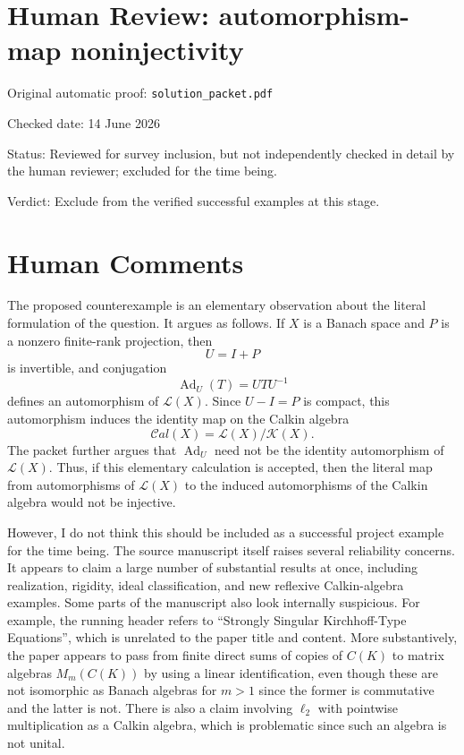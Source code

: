 \documentclass[11pt]{article}
\newcommand{\Lop}{\mathcal L}
\newcommand{\K}{\mathcal K}
\newcommand{\Cal}{\mathcal C\!al}
\newcommand{\Ad}{\operatorname{Ad}}
\begin{document}
\section*{Human Review: automorphism-map noninjectivity}

\noindent Original automatic proof: \texttt{solution\_packet.pdf}

\noindent Checked date: 14 June 2026

\noindent Status: Reviewed for survey inclusion, but not independently checked
in detail by the human reviewer; excluded for the time being.

\noindent Verdict: Exclude from the verified successful examples at this stage.

\section*{Human Comments}

The proposed counterexample is an elementary observation about the literal
formulation of the question.  It argues as follows.  If \(X\) is a Banach
space and \(P\) is a nonzero finite-rank projection, then
\[
  U=I+P
\]
is invertible, and conjugation
\[
  \Ad_U(T)=UTU^{-1}
\]
defines an automorphism of \(\Lop(X)\).  Since \(U-I=P\) is compact, this
automorphism induces the identity map on the Calkin algebra
\[
  \Cal(X)=\Lop(X)/\K(X).
\]
The packet further argues that \(\Ad_U\) need not be the identity
automorphism of \(\Lop(X)\).  Thus, if this elementary calculation is
accepted, then the literal map from automorphisms of \(\Lop(X)\) to the
induced automorphisms of the Calkin algebra would not be injective.

However, I do not think this should be included as a successful project
example for the time being.  The source manuscript itself raises several
reliability concerns.  It appears to claim a large number of substantial
results at once, including realization, rigidity, ideal classification, and
new reflexive Calkin-algebra examples.  Some parts of the manuscript also
look internally suspicious.  For example, the running header refers to
``Strongly Singular Kirchhoff-Type Equations'', which is unrelated to the
paper title and content.  More substantively, the paper appears to pass from
finite direct sums of copies of \(C(K)\) to matrix algebras \(M_m(C(K))\) by
using a linear identification, even though these are not isomorphic as Banach
algebras for \(m>1\) since the former is commutative and the latter is not.
There is also a claim involving \(\ell_2\) with pointwise multiplication as a
Calkin algebra, which is problematic since such an algebra is not unital.
\end{document}
